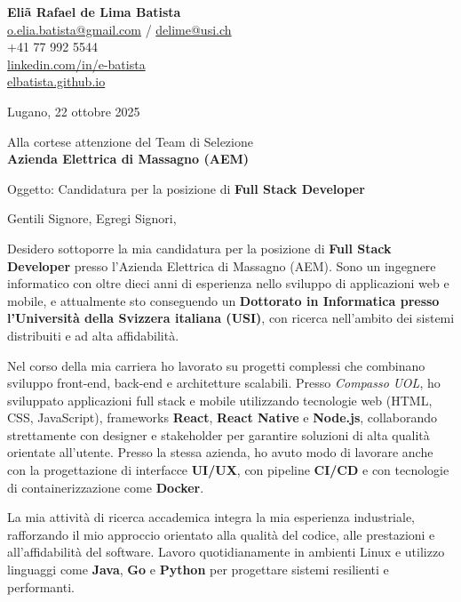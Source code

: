 \documentclass[11pt]{article}
\begin{document}
\noindent
\textbf{Eliã Rafael de Lima Batista} \\
\href{mailto:o.elia.batista@gmail.com}{o.elia.batista@gmail.com} / \href{mailto:delime@usi.ch}{delime@usi.ch} \\
+41 77 992 5544 \\
\href{https://linkedin.com/in/e-batista}{linkedin.com/in/e-batista} \\
\href{https://elbatista.github.io}{elbatista.github.io}

\vspace{1em}

Lugano, 22 ottobre 2025 \\
\vspace{1em}

Alla cortese attenzione del Team di Selezione \\
\textbf{Azienda Elettrica di Massagno (AEM)}


Oggetto: Candidatura per la posizione di \textbf{Full Stack Developer}

\vspace{1em}

Gentili Signore, Egregi Signori,

\vspace{1em}

Desidero sottoporre la mia candidatura per la posizione di \textbf{Full Stack Developer} presso l’Azienda Elettrica di Massagno (AEM). Sono un ingegnere informatico con oltre dieci anni di esperienza nello sviluppo di applicazioni web e mobile, e attualmente sto conseguendo un \textbf{Dottorato in Informatica presso l’Università della Svizzera italiana (USI)}, con ricerca nell’ambito dei sistemi distribuiti e ad alta affidabilità.

Nel corso della mia carriera ho lavorato su progetti complessi che combinano sviluppo front-end, back-end e architetture scalabili. Presso \textit{Compasso UOL}, ho sviluppato applicazioni full stack e mobile utilizzando tecnologie web (HTML, CSS, JavaScript), frameworks \textbf{React}, \textbf{React Native} e \textbf{Node.js}, collaborando strettamente con designer e stakeholder per garantire soluzioni di alta qualità orientate all’utente. Presso la stessa azienda, ho avuto modo di lavorare anche con la progettazione di interfacce \textbf{UI/UX}, con pipeline \textbf{CI/CD} e con tecnologie di containerizzazione come \textbf{Docker}.

La mia attività di ricerca accademica integra la mia esperienza industriale, rafforzando il mio approccio orientato alla qualità del codice, alle prestazioni e all’affidabilità del software. Lavoro quotidianamente in ambienti Linux e utilizzo linguaggi come \textbf{Java}, \textbf{Go} e \textbf{Python} per progettare sistemi resilienti e performanti.
\end{document}
